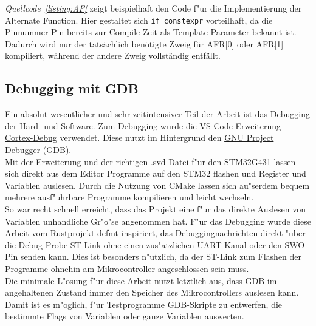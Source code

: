 \documentclass[11pt]{article}
\newcommand*{\coderef}[1]{\textit{Quellcode~\ref{#1}}}
\newcommand{\cpp}[1]{\texttt{#1}}
\begin{document}
\coderef{listing:AF} zeigt beispielhaft den Code f"ur die Implementierung der Alternate Function.
Hier gestaltet sich \cpp{if constexpr} vorteilhaft, da die Pinnummer Pin bereits zur Compile-Zeit als Template-Parameter bekannt ist. 
Dadurch wird nur der tatsächlich benötigte Zweig für AFR[0] oder AFR[1] kompiliert, während der andere Zweig vollständig entfällt.


\subsection{Debugging mit GDB}
Ein absolut wesentlicher und sehr zeitintensiver Teil der Arbeit ist das Debugging der Hard- und Software.
Zum Debugging wurde die VS Code Erweiterung \href{https://marketplace.visualstudio.com/items?itemName=marus25.cortex-debug}{Cortex-Debug}
verwendet. Diese nutzt im Hintergrund den \href{https://www.sourceware.org/gdb/}{GNU Project Debugger (GDB)}. \\
Mit der Erweiterung und der richtigen .svd Datei f"ur den STM32G431 lassen sich direkt aus dem Editor Programme 
auf den STM32 flashen und Register und Variablen auslesen. Durch die Nutzung von CMake lassen sich au"serdem
bequem mehrere ausf"uhrbare Programme kompilieren und leicht wechseln.\\
So war recht schnell erreicht, dass das Projekt eine f"ur das direkte Auslesen
von Variablen unhandliche Gr"o"se angenommen hat. 
F"ur das Debugging wurde diese Arbeit vom Rustprojekt \href{https://defmt.ferrous-systems.com/}{defmt} inspiriert,
das Debuggingnachrichten direkt "uber die Debug-Probe ST-Link ohne einen zus"atzlichen UART-Kanal oder
den SWO-Pin senden kann. Dies ist besonders n"utzlich, da der ST-Link zum Flashen der Programme ohnehin am 
Mikrocontroller angeschlossen sein muss. \\ 
Die minimale L"osung f"ur diese Arbeit nutzt letztlich aus, dass GDB im angehaltenen Zustand immer den Speicher des
Mikrocontrollers auslesen kann. Damit ist es m"oglich, f"ur Testprogramme GDB-Skripte zu entwerfen, die
bestimmte Flags von Variablen oder ganze Variablen auswerten.
\end{document}
